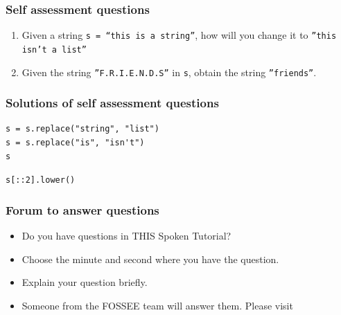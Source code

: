 \documentclass[17pt]{beamer}
\begin{document}
\begin{frame}
\frametitle{Self assessment questions}
\label{sec-10}


\begin{enumerate}
\item Given a string \texttt{s = ``this is a string''}, how will you change it
   to \texttt{''this isn't a list''}\pause
\vspace{12pt}   
\item Given the string \texttt{''F.R.I.E.N.D.S''} in \texttt{s}, obtain the string \texttt{''friends''}.
\end{enumerate}
\end{frame}
\begin{frame}[fragile]
\frametitle{Solutions of self assessment questions}
\label{sec-11}


\begin{enumerate}
\begin{small}
\item \lstset{language=Python}
\begin{lstlisting}
s = s.replace("string", "list")
s = s.replace("is", "isn't")
s
\end{lstlisting}\pause
\vspace{8pt}
\item \texttt{s[::2].lower()}
\end{small}
\end{enumerate}
\end{frame}
\begin{frame}
\frametitle{Forum to answer questions}
\begin{itemize}
\item Do you have questions in THIS Spoken Tutorial?
\item Choose the minute and second where you have the question.
\item Explain your question briefly.
\item Someone from the FOSSEE team will answer them. Please visit 
\end{itemize}
\begin{center}
{\color{blue}{http://forums.spoken-tutorial.org/}}
 \end{center} 
\end{frame}
\end{document}
